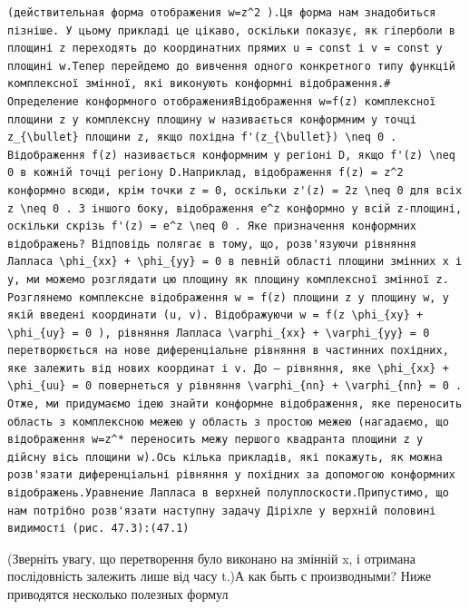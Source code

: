 \documentclass[
  ukrainian,
]{article}
\begin{document}
\begin{verbatim}
(действительная форма отображения w=z^2 ).Ця форма нам знадобиться пізніше. У цьому прикладі це цікаво, оскільки показує, як гіперболи в площині z переходять до координатних прямих u = const і v = const у площині w.Тепер перейдемо до вивчення одного конкретного типу функцій комплексної змінної, які виконують конформні відображення.# Определение конформного отображенияВідображення w=f(z) комплексної площини z у комплексну площину w називається конформним у точці z_{\bullet} площини z, якщо похідна f'(z_{\bullet}) \neq 0 . Відображення f(z) називається конформним у регіоні D, якщо f'(z) \neq 0 в кожній точці регіону D.Наприклад, відображення f(z) = z^2 конформно всюди, крім точки z = 0, оскільки z'(z) = 2z \neq 0 для всіх z \neq 0 . З іншого боку, відображення e^z конформно у всій z-площині, оскільки скрізь f'(z) = e^z \neq 0 . Яке призначення конформних відображень? Відповідь полягає в тому, що, розв'язуючи рівняння Лапласа \phi_{xx} + \phi_{yy} = 0 в певній області площини змінних x і y, ми можемо розглядати цю площину як площину комплексної змінної z. Розглянемо комплексне відображення w = f(z) площини z у площину w, у якій введені координати (u, v). Відображуючи w = f(z \phi_{xy} + \phi_{uy} = 0 ), рівняння Лапласа \varphi_{xx} + \varphi_{yy} = 0 перетворюється на нове диференціальне рівняння в частинних похідних, яке залежить від нових координат і v. До — рівняння, яке \phi_{xx} + \phi_{uu} = 0 повернеться у рівняння \varphi_{nn} + \varphi_{nn} = 0 . Отже, ми придумаємо ідею знайти конформне відображення, яке переносить область з комплексною межею у область з простою межею (нагадаємо, що відображення w=z^* переносить межу першого квадранта площини z у дійсну вісь площини w).Ось кілька прикладів, які покажуть, як можна розв'язати диференціальні рівняння у похідних за допомогою конформних відображень.Уравнение Лапласа в верхней полуплоскости.Припустимо, що нам потрібно розв'язати наступну задачу Діріхле у верхній половині видимості (рис. 47.3):(47.1)
\end{verbatim}

(Зверніть увагу, що перетворення було виконано на змінній x, і отримана
послідовність залежить лише від часу t.)А как быть с производными? Ниже
приводятся несколько полезных формул
\end{document}

